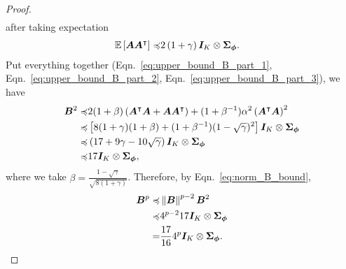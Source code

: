\begin{proof}
\begin{equation*}
\begin{aligned}
\end{aligned}
\end{equation*}
after taking expectation
\begin{equation}\label{eq:upper_bound_B_part_3}
\begin{aligned}
    {\mathbb E}\left[{{\bm{A}}{\bm{A}}^{\intercal}}\right]\preccurlyeq&2\left({1+\gamma}\right){\bm{I}}_K\otimes{\bm{\Sigma}}_{{\bm{\phi}}}.
\end{aligned}
\end{equation}
Put everything together (Eqn.~\eqref{eq:upper_bound_B_part_1}, Eqn.~\eqref{eq:upper_bound_B_part_2}, Eqn.~\eqref{eq:upper_bound_B_part_3}), we have
\begin{equation*}
\begin{aligned}
    {\bm{B}}^2\preccurlyeq&2(1+\beta)\left({{\bm{A}}^{\intercal}{\bm{A}}+{\bm{A}}{\bm{A}}^{\intercal}}\right)+(1+\beta^{-1})\alpha^2\left({{\bm{A}}^{\intercal}{\bm{A}}}\right)^2\\
    \preccurlyeq&\left[{8(1+\gamma)(1+\beta)+(1+\beta^{-1})(1-\sqrt{\gamma})^2}\right]{\bm{I}}_K\otimes{\bm{\Sigma}}_{{\bm{\phi}}}\\
    \preccurlyeq&\left({17+9\gamma-10\sqrt{\gamma}}\right){\bm{I}}_K\otimes{\bm{\Sigma}}_{{\bm{\phi}}}\\
    \preccurlyeq&17{\bm{I}}_K\otimes{\bm{\Sigma}}_{{\bm{\phi}}},
\end{aligned}
\end{equation*}
where we take $\beta=\frac{1-\sqrt{\gamma}}{\sqrt{8(1+\gamma)}}$.
Therefore, by Eqn.~\eqref{eq:norm_B_bound},
\begin{equation*}
\begin{aligned}
    {\bm{B}}^p\preccurlyeq& \left\|{{\bm{B}}}\right\|^{p-2}{\bm{B}}^2\\
    \preccurlyeq& 4^{p-2}17{\bm{I}}_K\otimes{\bm{\Sigma}}_{{\bm{\phi}}}\\
    =&\frac{17}{16}4^p{\bm{I}}_K\otimes{\bm{\Sigma}}_{{\bm{\phi}}}.
\end{aligned}
\end{equation*}
\end{proof}

